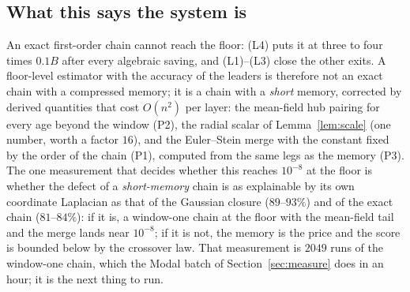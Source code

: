 \subsection{What this says the system is}
An exact first-order chain cannot reach the floor: (L4) puts it at three to four times $0.1B$ after every
algebraic saving, and (L1)--(L3) close the other exits. A floor-level estimator with the accuracy of the leaders is
therefore not an exact chain with a compressed memory; it is a chain with a \emph{short} memory, corrected by
derived quantities that cost $O(n^2)$ per layer: the mean-field hub pairing for every age beyond the window (P2),
the radial scalar of Lemma~\ref{lem:scale} (one number, worth a factor $16$), and the Euler--Stein merge with the
constant fixed by the order of the chain (P1), computed from the same legs as the memory (P3). The one measurement
that decides whether this reaches $10^{-8}$ at the floor is whether the defect of a \emph{short-memory} chain is
as explainable by its own coordinate Laplacian as that of the Gaussian closure ($89$--$93\%$) and of the exact chain
($81$--$84\%$): if it is, a window-one chain at the floor with the mean-field tail and the merge lands near
$10^{-8}$; if it is not, the memory is the price and the score is bounded below by the crossover law. That
measurement is $2049$ runs of the window-one chain, which the Modal batch of Section~\ref{sec:measure} does in an
hour; it is the next thing to run.

